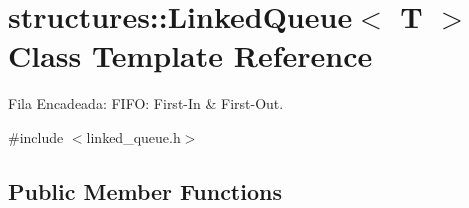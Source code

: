 \hypertarget{classstructures_1_1LinkedQueue}{}\section{structures\+:\+:Linked\+Queue$<$ T $>$ Class Template Reference}
\label{classstructures_1_1LinkedQueue}


Fila Encadeada\+: F\+I\+FO\+: First-\/\+In \& First-\/\+Out.  




{\ttfamily \#include $<$linked\+\_\+queue.\+h$>$}

\subsection*{Public Member Functions}
